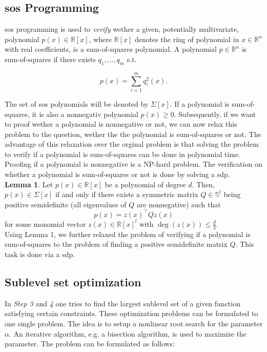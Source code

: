 \documentclass[10pt,a4paper,titlepage]{article}
\begin{document}
\subsection{\gls{sos} Programming \cite{cunis_loureiro2023}}
\gls{sos} programming is used to \textit{verify} wether a given, potentially multivariate, polynomial $p(x) \in \mathbb{R}[x]$, where $\mathbb{R}[x]$ denotes
the ring of polynomial in $x \in \mathbb{R}^n$ with real coefficients, is a sum-of-squares polynomial. A polynomial $p \in \mathbb{R}^n$ is sum-of-squares if
there exists $q_1, \dots, q_m$ s.t.

\begin{equation}
	p(x)=\sum_{i=1}^m q_i^2(x).
\end{equation}

The set of \gls{sos} polynomials will be denoted by $\Sigma[x]$. If a polynomial is sum-of-squares, it is also a nonnegativ polynomial $p(x) \geq 0$.
Subsequently, if we want to proof wether a polynomial is nonnegative or not, we can now relax this problem to the question, wether the the polynomial
is sum-of-squares or not. The advantage of this relaxation over the orginal problem is that solving the problem to verify if a polynomial is 
sum-of-squares can be done in polynomial time. Proofing if a polynomial is nonnegative is a NP-hard problem. The verification on whether a polynomial
is sum-of-squares or not is done by solving a \gls{sdp}.\\

\textbf{Lemma 1}. Let $p(x) \in \mathbb{R}[x]$ be a polynomial of degree $d$. Then, $p(x) \in \Sigma[x]$ if and only if there exists a symmetric
matrix $Q \in \mathbb{S}^l$ being positive semidefinite (all eigenvalues of $Q$ are nonnegative) such that
\begin{equation}
	p(x)=z(x)^{\top} Q z(x)
\end{equation}
for some monomial vector $z(x) \in \mathbb{R}[x]^l$ with $\operatorname{deg}(z(x)) \leq \frac{d}{2}$.\\

Using Lemma 1, we further relaxed the problem of verifying if a polynomial is sum-of-squares to the problem of finding a positive semidefinite matrix $Q$.
This task is done via a \gls{sdp}.



\subsection{Sublevel set optimization}
In \textit{Step 3} and \textit{4} one tries to find the largest sublevel set of a given function satisfying certain constraints. These optimization problems
can be formulated to one single problem. The idea is to setup a nonlinear root search for the parameter $\alpha$. An iterative 
algorithm, e.g. a bisection algorithm, is used to maximize the parameter. The problem can be formulated as follows:
\end{document}
